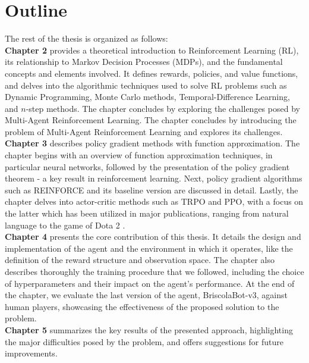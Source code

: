 \section{Outline}
The rest of the thesis is organized as follows:\\
\textbf{Chapter 2} provides a theoretical introduction to Reinforcement Learning (RL), its relationship to Markov Decision Processes (MDPs), and the fundamental concepts and elements involved. It defines rewards, policies, and value functions, and delves into the algorithmic techniques used to solve RL problems such as Dynamic Programming, Monte Carlo methods, Temporal-Difference Learning, and $n$-step methods. The chapter concludes by exploring the challenges posed by Multi-Agent Reinforcement Learning. The chapter concludes by introducing the problem of Multi-Agent Reinforcement Learning and explores its challenges.\\
\textbf{Chapter 3} describes policy gradient methods with function approximation. The chapter begins with an overview of function approximation techniques, in particular neural networks, followed by the presentation of the policy gradient theorem - a key result in reinforcement learning. Next, policy gradient algorithms such as REINFORCE and its baseline version are discussed in detail. Lastly, the chapter delves into actor-critic methods such as TRPO and PPO, with a focus on the latter which has been utilized in major publications, ranging from natural language \cite{instruct-gpt} to the game of Dota 2 \cite{open-ai-five}.\\
\textbf{Chapter 4} presents the core contribution of this thesis. It details the design and implementation of the agent and the environment in which it operates, like the definition of the reward structure and observation space. The chapter also describes thoroughly the training procedure that we followed, including the choice of hyperparameters and their impact on the agent's performance. At the end of the chapter, we evaluate the last version of the agent, BriscolaBot-v3, against human players, showcasing the effectiveness of the proposed solution to the problem.\\
\textbf{Chapter 5} summarizes the key results of the presented approach, highlighting the major difficulties posed by the problem, and offers suggestions for future improvements.